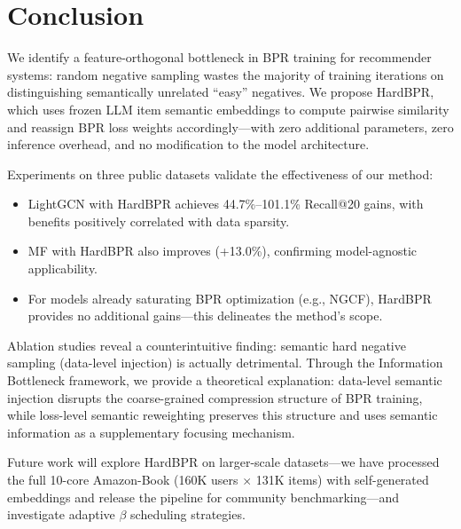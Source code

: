 \documentclass[11pt,a4paper]{article}
\begin{document}
\section{Conclusion}

We identify a feature-orthogonal bottleneck in BPR training for recommender systems: random negative sampling wastes the majority of training iterations on distinguishing semantically unrelated ``easy'' negatives. We propose HardBPR, which uses frozen LLM item semantic embeddings to compute pairwise similarity and reassign BPR loss weights accordingly---with zero additional parameters, zero inference overhead, and no modification to the model architecture.

Experiments on three public datasets validate the effectiveness of our method:
\begin{itemize}
    \item LightGCN with HardBPR achieves 44.7\%--101.1\% Recall@20 gains, with benefits positively correlated with data sparsity.
    \item MF with HardBPR also improves (+13.0\%), confirming model-agnostic applicability.
    \item For models already saturating BPR optimization (e.g., NGCF), HardBPR provides no additional gains---this delineates the method's scope.
\end{itemize}

Ablation studies reveal a counterintuitive finding: semantic hard negative sampling (data-level injection) is actually detrimental. Through the Information Bottleneck framework, we provide a theoretical explanation: data-level semantic injection disrupts the coarse-grained compression structure of BPR training, while loss-level semantic reweighting preserves this structure and uses semantic information as a supplementary focusing mechanism.

Future work will explore HardBPR on larger-scale datasets---we have processed the full 10-core Amazon-Book (160K users $\times$ 131K items) with self-generated embeddings and release the pipeline for community benchmarking---and investigate adaptive $\beta$ scheduling strategies.

\end{document}
